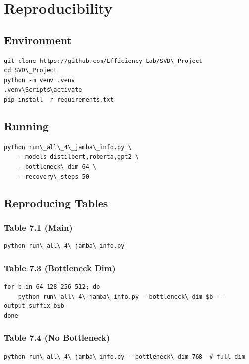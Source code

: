 \section{Reproducibility}

\subsection{Environment}

\begin{lstlisting}
git clone https://github.com/Efficiency Lab/SVD\_Project
cd SVD\_Project
python -m venv .venv
.venv\Scripts\activate
pip install -r requirements.txt
\end{lstlisting}

\subsection{Running}

\begin{lstlisting}
python run\_all\_4\_jamba\_info.py \
    --models distilbert,roberta,gpt2 \
    --bottleneck\_dim 64 \
    --recovery\_steps 50
\end{lstlisting}

\subsection{Reproducing Tables}

\subsubsection{Table 7.1 (Main)}
\begin{lstlisting}
python run\_all\_4\_jamba\_info.py
\end{lstlisting}

\subsubsection{Table 7.3 (Bottleneck Dim)}
\begin{lstlisting}
for b in 64 128 256 512; do
    python run\_all\_4\_jamba\_info.py --bottleneck\_dim $b --output_suffix b$b
done
\end{lstlisting}

\subsubsection{Table 7.4 (No Bottleneck)}
\begin{lstlisting}
python run\_all\_4\_jamba\_info.py --bottleneck\_dim 768  # full dim
\end{lstlisting}

